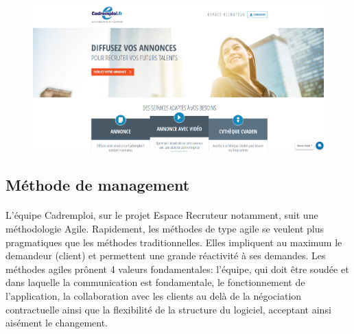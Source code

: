 \begin{figure}[h]
  \begin{center}
    \hspace*{-1in}
    \includegraphics[width=1\textwidth]{Pictures/EspaceRecruteur.png}
  \end{center}
\end{figure}

\subsection{Méthode de management}
\label{sub:Méthode de management}
\paragraph{}
L'équipe Cadremploi, sur le projet Espace Recruteur notamment, suit une méthodologie Agile.
Rapidement, les méthodes de type agile se veulent plus pragmatiques que les méthodes traditionnelles.
Elles impliquent au maximum le demandeur (client) et permettent une grande réactivité à ses demandes.
Les méthodes agiles prônent 4 valeurs fondamentales: l'équipe, qui doit être soudée et dans laquelle la communication est fondamentale, le fonctionnement de l'application, la collaboration avec les clients au delà de la négociation contractuelle ainsi que la flexibilité de la structure du logiciel, acceptant ainsi aisément le changement.



